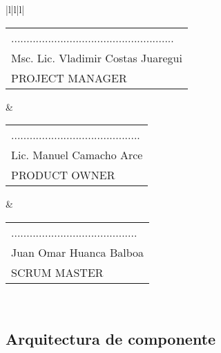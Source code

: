 \begin{minipage}[!htb]{\hsize}
\begin{tabular}{|l|l|l|}
 \\ \hline
\begin{tabular}[c]{@{}l@{}}.....................................................\\ Msc. Lic. Vladimir Costas Juaregui\\ PROJECT MANAGER\end{tabular} & \begin{tabular}[c]{@{}l@{}}..........................................\\ Lic. Manuel Camacho Arce\\ PRODUCT OWNER\end{tabular} & \begin{tabular}[c]{@{}l@{}}.........................................\\ Juan Omar Huanca Balboa\\ SCRUM MASTER\end{tabular} \\ \hline
\end{tabular}
\label{Tarjeta historia de usuario 58}
\end{minipage}

\subsection{Arquitectura de componente}

